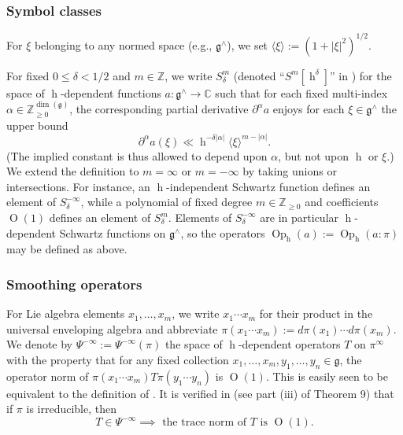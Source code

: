\documentclass[reqno,10pt]{amsart}
\theoremstyle{plain} %
\theoremstyle{definition}
\theoremstyle{plain} %
\theoremstyle{remark}
\theoremstyle{itplain} %
\theoremstyle{remark} %
\renewcommand{\geq}{\geqslant}
\renewcommand{\leq}{\leqslant}
\numberwithin{equation}{section}
\def\O{\operatorname{O}}
\DeclareMathOperator{\Opp}{Op}
\DeclareMathOperator{\h}{h}
\begin{document}
\subsubsection{Symbol classes}\label{sec:35ac3e5764}
For $\xi$ belonging to any normed space (e.g., $\mathfrak{g}^\wedge$), we set $\langle \xi \rangle := (1 + |\xi|^2)^{1/2}$.

For fixed $0 \leq \delta < 1/2$ and $m \in \mathbb{Z}$, we write $S^m_\delta$ (denoted ``$S^m[\h^\delta]$'' in \cite[\S4]{nelson-venkatesh-1}) for the space of $\h$-dependent functions $a : \mathfrak{g}^\wedge \rightarrow \mathbb{C}$ such that for each fixed multi-index $\alpha \in \mathbb{Z}_{\geq 0}^{\dim(\mathfrak{g})}$, the corresponding partial derivative $\partial^{\alpha} a$ enjoys for each $\xi \in \mathfrak{g}^\wedge$ the upper bound
\[
  \partial^\alpha a(\xi) \ll \h^{-\delta |\alpha|} \langle \xi \rangle^{m-|\alpha|}.
\]
(The implied constant is thus allowed to depend upon $\alpha$, but not upon $\h$ or $\xi$.)  We extend the definition to $m = \infty$ or $m = -\infty$ by taking unions or intersections.
For instance, an $\h$-independent Schwartz function defines an element of $S^{-\infty}_\delta$, while a polynomial of fixed degree $m \in \mathbb{Z}_{\geq 0}$ and coefficients $\O(1)$ defines an element of $S^m_\delta$.  Elements of $S^{-\infty}_\delta$ are in particular $\h$-dependent Schwartz functions on $\mathfrak{g}^\wedge$, so the operators $\Opp_{\h}(a) := \Opp_{\h}(a:\pi)$ may be defined as above.

\subsubsection{Smoothing operators}\label{sec:35ac3e5766}
For Lie algebra elements $x_1,\dotsc,x_m$, we write $x_1 \dotsb x_m$ for their product in the universal enveloping algebra and abbreviate $\pi(x_1 \dotsb x_m) := d \pi(x_1) \dotsb d \pi(x_m)$.  We denote by $\Psi^{-\infty} := \Psi^{-\infty}(\pi)$ the space of $\h$-dependent operators $T$ on $\pi^\infty$ with the property that for any fixed collection $x_1,\dotsc,x_m,y_1,\dotsc,y_n \in \mathfrak{g}$, the operator norm of $\pi(x_1 \dotsb x_m) T \pi(y_1 \dotsb y_n)$ is $\O(1)$.  This is easily seen to be equivalent to the definition of \cite[\S3]{nelson-venkatesh-1}.  It is verified in \cite[\S12.3]{nelson-venkatesh-1} (see part (iii) of Theorem 9) that if $\pi$ is irreducible, then
\begin{equation}\label{eq:smoothing-ops-have-controlled-trace-norm}
  T \in \Psi^{-\infty}
  \implies
  \text{ the trace norm of $T$ is $\O(1)$}.
\end{equation}
\end{document}
